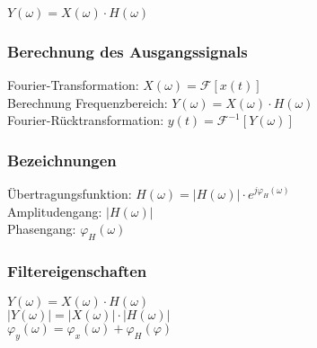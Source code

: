 \begin{multicols}{2}
    $ Y(\omega) = X(\omega) \cdot H(\omega)$
    \subsubsection*{Berechnung des Ausgangssignals}

    Fourier-Transformation:  $X(\omega) = \mathcal{F}[x(t)]$ \\
    Berechnung Frequenzbereich:  $Y(\omega) = X(\omega) \cdot H(\omega)$ \\
    Fourier-Rücktransformation:  $y(t) = \mathcal{F}^{-1}[Y(\omega)]$ \\


    \subsubsection*{Bezeichnungen}
    Übertragungsfunktion: $H(\omega)=|H(\omega)| \cdot e^{j\varphi_H(\omega)}$ \\
    Amplitudengang: $|H(\omega)|$ \\
    Phasengang: $\varphi_H(\omega)$ \\

    \subsubsection*{Filtereigenschaften}
    $Y(\omega) = X(\omega) \cdot H(\omega)$ \\
    $|Y(\omega)| = |X(\omega)| \cdot |H(\omega)|$ \\
    $\varphi_y(\omega) = \varphi_x(\omega) + \varphi_H(\varphi)$



\end{multicols}
